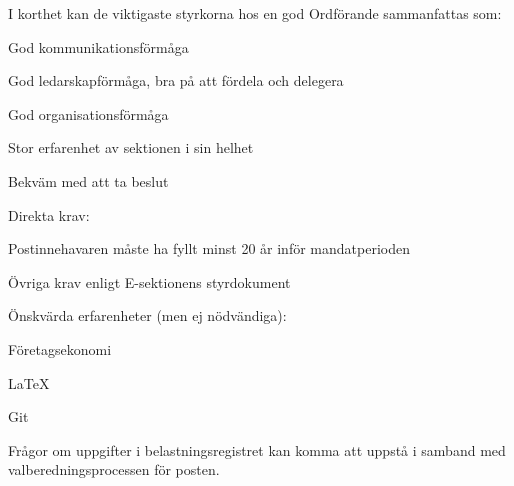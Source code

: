 \documentclass[10pt]{article}
\def\post{Ordförande}
\begin{document}

I korthet kan de viktigaste styrkorna hos en god {\post} sammanfattas som:
\begin{dashlist}
    \item God kommunikationsförmåga
    \item God ledarskapförmåga, bra på att fördela och delegera
    \item God organisationsförmåga
    \item Stor erfarenhet av sektionen i sin helhet
    \item Bekväm med att ta beslut
\end{dashlist}

Direkta krav:
\begin{dashlist}
    \item Postinnehavaren måste ha fyllt minst 20 år inför mandatperioden
    \item Övriga krav enligt E-sektionens styrdokument
\end{dashlist}


Önskvärda erfarenheter (men ej nödvändiga):
\begin{dashlist}
    \item Företagsekonomi
    \item \LaTeX
    \item Git
\end{dashlist}

Frågor om uppgifter i belastningsregistret kan komma att uppstå i samband med valberedningsprocessen för posten.
\end{document}
